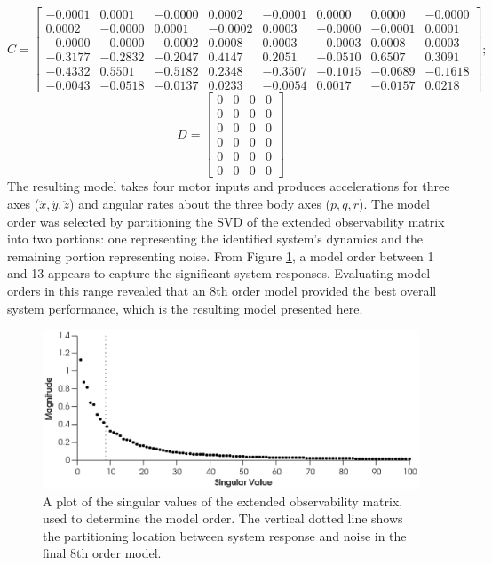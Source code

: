 \begin{equation*}
C = \begin{bmatrix}
-0.0001&0.0001&-0.0000&0.0002&-0.0001&0.0000&0.0000&-0.0000\\
0.0002&-0.0000&0.0001&-0.0002&0.0003&-0.0000&-0.0001&0.0001\\
-0.0000&-0.0000&-0.0002&0.0008&0.0003&-0.0003&0.0008&0.0003\\
-0.3177&-0.2832&-0.2047&0.4147&0.2051&-0.0510&0.6507&0.3091\\
-0.4332&0.5501&-0.5182&0.2348&-0.3507&-0.1015&-0.0689&-0.1618\\
-0.0043&-0.0518&-0.0137&0.0233&-0.0054&0.0017&-0.0157&0.0218
\end{bmatrix};
\end{equation*} 
\begin{equation*}
D = \begin{bmatrix}
0&0&0&0\\
0&0&0&0\\
0&0&0&0\\
0&0&0&0\\
0&0&0&0\\
0&0&0&0
\end{bmatrix}
\end{equation*}
\normalsize %
The resulting model takes four motor inputs and produces accelerations for three axes ($\ddot x, \ddot y, \ddot z$) and angular rates about the three body axes ($p, q, r$). The model order was selected by partitioning the SVD of the extended observability matrix into two portions: one representing the identified system's dynamics and the remaining portion representing noise. From Figure \ref{fig:5_singular_values}, a model order between 1 and 13 appears to capture the significant system responses. Evaluating model orders in this range revealed that an 8th order model provided the best overall system performance, which is the resulting model presented here. 
\begin{figure}[htb!]\label{fig:5_singular_values}
	\centering
	\includegraphics{../fig/singular_values_parsim.eps}
	\caption{A plot of the singular values of the extended observability matrix, used to determine the model order. The vertical dotted line shows the partitioning location between system response and noise in the final 8th order model.}
\end{figure}



